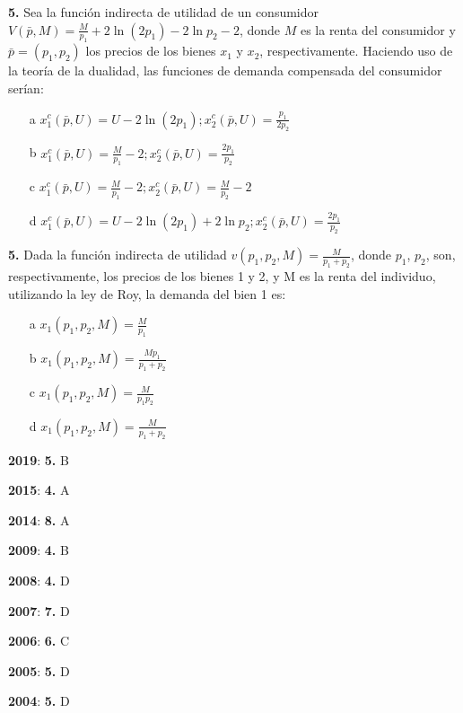 \documentclass{nuevotema}
\begin{document}
\textbf{5.} Sea la función indirecta de utilidad de un consumidor $V(\bar{p}, M) = \frac{M}{p_1} + 2 \ln (2p_1) - 2 \ln p_2 - 2$, donde $M$ es la renta del consumidor y $\bar{p} = (p_1, p_2)$ los precios de los bienes $x_1$ y $x_2$, respectivamente. Haciendo uso de la teoría de la dualidad, las funciones de demanda compensada del consumidor serían:

\begin{enumerate}
	\item[a] $x_1^c (\bar{p}, U) = U -2 \ln (2p_1); x_2^c(\bar{p}, U) = \frac{p_1}{2p_2}$
	\item[b] $x_1^c (\bar{p}, U) = \frac{M}{p_1} - 2 ; x_2^c(\bar{p}, U) = \frac{2p_1}{p_2} $
	\item[c] $x_1^c (\bar{p}, U) = \frac{M}{p_1} - 2 ; x_2^c(\bar{p}, U) = \frac{M}{p_2} - 2 $
	\item[d] $x_1^c (\bar{p}, U) = U - 2 \ln (2p_1) + 2 \ln p_2 ; x_2^c(\bar{p}, U) = \frac{2p_1}{p_2} $
\end{enumerate}

\textbf{5.} Dada la función indirecta de utilidad $v(p_1, p_2, M) = \frac{M}{p_1+p_2}$, donde $p_1$, $p_2$, son, respectivamente, los precios de los bienes 1 y 2, y M es la renta del individuo, utilizando la ley de Roy, la demanda del bien 1 es:
\begin{enumerate}
	\item[a] $x_1(p_1, p_2, M) = \frac{M}{p_1}$
	\item[b] $x_1(p_1, p_2, M) = \frac{Mp_1}{p_1+p_2}$
	\item[c] $x_1(p_1, p_2, M) = \frac{M}{p_1 p_2}$
	\item[d] $x_1(p_1, p_2, M) = \frac{M}{p_1 + p_2}$
\end{enumerate}

\notas


\textbf{2019}: \textbf{5.} B

\textbf{2015}: \textbf{4.} A

\textbf{2014}: \textbf{8.} A

\textbf{2009}: \textbf{4.} B

\textbf{2008}: \textbf{4.} D

\textbf{2007}: \textbf{7.} D

\textbf{2006}: \textbf{6.} C

\textbf{2005}: \textbf{5.} D

\textbf{2004}: \textbf{5.} D


\bibliografia
\end{document}

